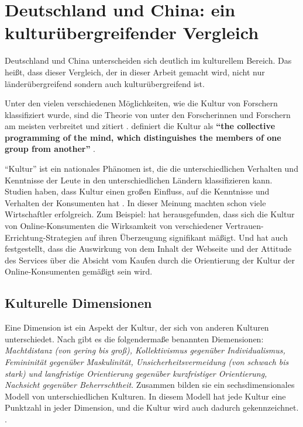 \section{Deutschland und China: ein kulturübergreifender Vergleich}
Deutschland und China unterscheiden sich deutlich im kulturellem Bereich. Das heißt, dass dieser Vergleich, der in dieser Arbeit gemacht wird, nicht nur länderübergreifend sondern auch kulturübergreifend ist.

Unter den vielen verschiedenen Möglichkeiten, wie die Kultur von Forschern klassifiziert wurde, sind die Theorie von \citet{hofstede2001culture} unter den Forscherinnen und Forschern am meisten verbreitet und zitiert \citep{Fong2008}. \citet{hofstede2001culture} definiert die Kultur als \textbf{``the collective programming of the mind, which distinguishes the members of one group from another''} \citep[p.~9]{hofstede2001culture}. 

``Kultur'' ist ein nationales Phänomen ist, die die unterschiedlichen Verhalten und Kenntnisse der Leute in den unterschiedlichen Ländern klassifizieren kann. Studien haben, dass Kultur einen großen Einfluss, auf die Kenntnisse und Verhalten der Konsumenten hat \citep{mccort1993culture, triandis1972analysis}. In dieser Meinung machten schon viele Wirtschaftler erfolgreich. Zum Beispiel: \citet{sia2009web} hat herausgefunden, dass sich die Kultur von Online-Konsumenten die Wirksamkeit von verschiedener Vertrauen-Errichtung-Strategien auf ihren Überzeugung signifikant mäßigt. Und \citet{Mazaheri2011958} hat auch festgestellt, dass die Auswirkung von dem Inhalt der Webseite und der Attitude des Services über die Absicht vom Kaufen durch die Orientierung der Kultur der Online-Konsumenten gemäßigt sein wird.
\subsection{Kulturelle Dimensionen}
Eine Dimension ist ein Aspekt der Kultur, der sich von anderen Kulturen unterschiedet. Nach \citet{hofstede2013interkulturelle} gibt es die folgendermaße benannten Diemensionen: \emph{Machtdistanz (von gering bis groß), Kollektivismus gegenüber Individualismus, Femininität gegenüber Maskulinität, Unsicherheitsvermeidung (von schwach bis stark) und langfristige Orientierung gegenüber kurzfristiger Orientierung, Nachsicht gegenüber Beherrschtheit}. Zusammen bilden sie ein sechsdimensionales Modell von unterschiedlichen Kulturen. In diesem Modell hat jede Kultur eine Punktzahl in jeder Dimension, und die Kultur wird auch dadurch gekennzeichnet. \citep[p. ~29]{hofstede2013interkulturelle}.

